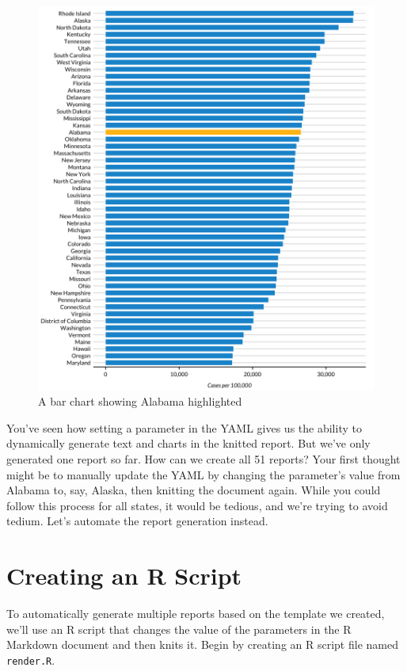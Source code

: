 \documentclass[
]{book}
\begin{document}
\begin{figure}
\includegraphics[width=1\linewidth]{assets/alabama-covid-chart} \caption{A bar chart showing Alabama highlighted}\label{fig:alabama-covid-chart}
\end{figure}

You've seen how setting a parameter in the YAML gives us the ability to dynamically generate text and charts in the knitted report. But we've only generated one report so far. How can we create all 51 reports? Your first thought might be to manually update the YAML by changing the parameter's value from Alabama to, say, Alaska, then knitting the document again. While you could follow this process for all states, it would be tedious, and we're trying to avoid tedium. Let's automate the report generation instead.

\hypertarget{creating-an-r-script}{%
\section*{Creating an R Script}\label{creating-an-r-script}}

To automatically generate multiple reports based on the template we created, we'll use an R script that changes the value of the parameters in the R Markdown document and then knits it. Begin by creating an R script file named \texttt{render.R}.
\end{document}
